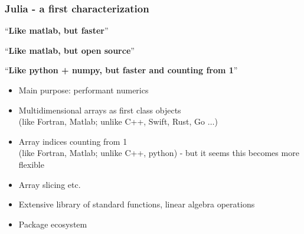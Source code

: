\begin{frame}\frametitle{Julia - a first characterization}
``\textbf{Like matlab, but faster}''

``\textbf{Like matlab, but open source}''

``\textbf{Like python + numpy, but faster and counting from 1}''

  \begin{itemize}
  \item Main purpose: performant numerics 
  \item Multidimensional arrays as first class objects\\
    (like Fortran, Matlab; unlike C++, Swift, Rust, Go $\dots$)
  \item  Array indices counting from 1\\ (like Fortran, Matlab; unlike C++, python) - but it seems this becomes
    more flexible
  \item Array slicing etc.
  \item Extensive library of standard functions, linear algebra operations
  \item Package ecosystem
  \end{itemize}
\end{frame}

